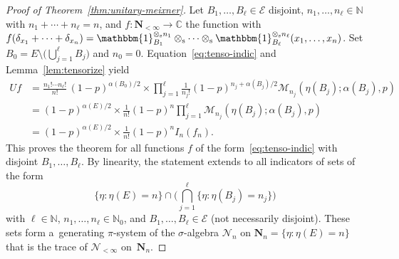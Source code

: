\documentclass[pdftex]{sigma}
\numberwithin{equation}{section}
\newcommand{\N}{\mathbb{N}}
\newcommand{\C}{\mathbb{C}}
\newcommand{\1}{\mathbbm{1}}
\begin{document}
\begin{proof}[Proof of Theorem~\ref{thm:unitary-meixner}]
	Let $B_1,\ldots, B_\ell \in \mathcal E$ disjoint, $n_1,\ldots,n_\ell \in \N$ with $n_1+\cdots + n_\ell=n$, and $f\colon \mathbf N_{<\infty}\to \C$ the function with $f(\delta_{x_1}+\cdots + \delta_{x_n}) = \1_{B_1}^{\otimes_\mathrm s n_1}\otimes_{\mathrm s} \cdots \otimes_{\mathrm s} \1_{B_\ell}^{\otimes_\mathrm s n_\ell}(x_1,\ldots,x_n)$. Set $B_0 = E\setminus \bigl(\bigcup_{j=1}^\ell B_j\bigr)$ and $n_0=0$. Equation~\eqref{eq:tenso-indic} and Lemma~\ref{lem:tensorize} yield
	\begin{align*}
		U f &{}= \frac{n_1!\cdots n_\ell!}{n!}\, (1-p)^{\alpha(B_0)/2} \times \prod_{j=1}^\ell \frac{1}{n_j!} (1-p)^{n_j+\alpha(B_j)/2}\mathcal M_{n_j}( \eta(B_j);\alpha(B_j),p) \\
				&{}= (1-p)^{\alpha(E)/2} \times \frac{1}{n!}(1-p)^n \prod_{j=1}^\ell \mathcal M_{n_j}( \eta(B_j);\alpha(B_j),p) \\
				&{}= (1-p)^{\alpha(E)/2} \times \frac{1}{n!}(1-p)^n I_n(f_n).
	\end{align*}
	This proves the theorem for all functions $f$ of the form~\eqref{eq:tenso-indic} with disjoint $B_1,\ldots, B_\ell$. By linearity, the statement extends to all indicators of sets of the form
	\[
		\{\eta\colon \eta(E) = n\}\cap \Biggl( \bigcap_{j=1}^\ell \{\eta\colon \eta(B_j) = n_j\}\Biggr)
	\]
	with $\ell \in \N$, $n_1,\ldots,n_\ell\in \N_0$, and $B_1,\ldots, B_\ell \in \mathcal E$ (not necessarily disjoint). These sets form a~generating $\pi$-system of the $\sigma$-algebra $\mathcal N_n$ on $\mathbf N_n =\{\eta\colon\eta(E) =n\}$ that is the trace of $\mathcal N_{<\infty}$ on~$\mathbf N_n$.
	

\end{proof}
\end{document}
